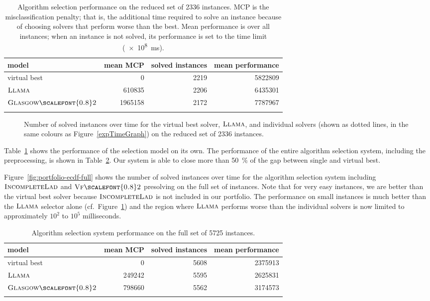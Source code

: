 \documentclass{llncs}
\newcommand{\VFtwo}{$\textsc{Vf{\scalefont{0.8}2}}$\xspace}
\newcommand{\IncompleteLAD}{$\textsc{IncompleteLad}$\xspace}
\newcommand{\GlasgowTwo}{$\textsc{Glasgow{\scalefont{0.8}2}}$\xspace}
\newcommand{\LLAMA}{$\textsc{Llama}$\xspace}
\begin{document}
\begin{table}[p]
    \centering\setlength{\tabcolsep}{1em}
\begin{tabular}{lrrr}
  \toprule
model & mean MCP & solved instances & mean performance\\
  \midrule
virtual best & 0 & 2219 & 5822809\\
\LLAMA & 610835 & 2206 & 6435301\\
\GlasgowTwo & 1965158 & 2172 & 7787967\\
   \bottomrule \\
\end{tabular}
\caption{Algorithm selection performance on the reduced set of 2336 instances. MCP is the
misclassification penalty; that is, the additional time required to solve an instance because of
choosing solvers that perform worse than the best. Mean performance is over all instances; when an
instance is not solved, its performance is set to the time limit
(\SI{e8}{\ms}).}\label{tab:res}
\end{table}

\begin{figure}[p]


\caption{Number of solved instances over time for the virtual best
solver, \LLAMA, and individual solvers (shown as dotted lines, in the same
colours as Figure~\ref{expTimeGraph}) on the reduced set of 2336 instances.}
\label{fig:portfolio-ecdf}
\end{figure}

Table~\ref{tab:res} shows the performance of the selection model on its own. The performance of the
entire algorithm selection system, including the preprocessing, is shown in Table~\ref{tab:resfull}.
Our system is able to close more than \SI{50}{\percent} of the gap between single and virtual best.

Figure~\ref{fig:portfolio-ecdf-full} shows the number of solved instances over time for the
algorithm selection system including \IncompleteLAD and \VFtwo presolving on the full set of
instances. Note that for very easy instances, we are better than the virtual best solver because
\IncompleteLAD is not included in our portfolio. The performance on small instances is much better
than the \LLAMA selector alone (cf.\ Figure~\ref{fig:portfolio-ecdf}) and the region where \LLAMA
performs worse than the individual solvers is now limited to approximately $10^2$ to $10^5$
milliseconds.

\begin{table}[p]
    \centering\setlength{\tabcolsep}{1em}
\begin{tabular}{lrrr}
  \toprule
model & mean MCP & solved instances & mean performance\\
  \midrule
virtual best & 0 & 5608 & 2375913\\
\LLAMA & 249242 & 5595 & 2625831\\
\GlasgowTwo & 798660 & 5562 & 3174573\\
   \bottomrule \\
\end{tabular}
\caption{Algorithm selection system performance on the full set of 5725
instances.}\label{tab:resfull}
\end{table}
\end{document}
